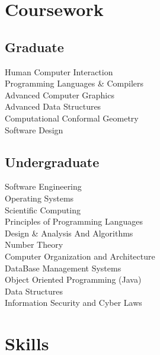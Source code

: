 \documentclass[hidelinks,letterpaper]{deedy-resume-openfont} %
\begin{document}
\begin{minipage}[t]{0.33\textwidth}
		\sectionsep
		
        
		\section{Coursework}
		
		\subsection{Graduate}
		Human Computer Interaction \\
		Programming Languages \& Compilers \\
		Advanced Computer Graphics \\
		Advanced Data Structures \\
		Computational Conformal Geometry \\
		Software Design \\
		
		\sectionsep
		
		
		\subsection{Undergraduate}
		
		Software Engineering \\
		Operating Systems\\ 
		Scientific Computing \\
		Principles of Programming Languages \\
		Design \& Analysis And Algorithms\\
		Number Theory \\ 
		Computer Organization and Architecture \\
		DataBase Management Systems \\
		Object Oriented Programming (Java) \\
		Data Structures \\
		Information Security and Cyber Laws \\
		\sectionsep
		
		
		\section{Skills}
		

\end{minipage}
\end{document}
